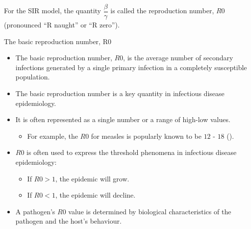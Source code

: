 \documentclass[
  ignorenonframetext,
]{beamer}
\providecommand{\tightlist}{%
  \setlength{\itemsep}{0pt}\setlength{\parskip}{0pt}}\usepackage{longtable,booktabs,array}
\begin{document}
\begin{frame}
For the SIR model, the quantity {\(\dfrac{\beta}{\gamma}\)} is called
the {reproduction number, \(R0\)} (pronounced ``R naught'' or ``R
zero'').
\end{frame}

\begin{frame}
\begin{block}{The basic reproduction number, R0}
\label{the-basic-reproduction-number-r0}
\begin{itemize}
\item
  The basic reproduction number, {\(R0\)}, is the average number of
  secondary infections generated by a {single primary infection} in a
  {completely susceptible} population.
\item
  The basic reproduction number is a key quantity in infectious disease
  epidemiology.
\end{itemize}
\end{block}
\end{frame}

\begin{frame}
\begin{itemize}
\tightlist
\item
  It is often represented as a single number or a range of high-low
  values.

  \begin{itemize}
  \tightlist
  \item
    For example, the \(R0\) for measles is popularly known to be \(12\)
    - \(18\) ().
  \end{itemize}
\end{itemize}
\end{frame}

\begin{frame}
\begin{itemize}
\tightlist
\item
  \(R0\) is often used to express the threshold phenomena in infectious
  disease epidemiology:

  \begin{itemize}
  \tightlist
  \item
    If \(R0 > 1\), the epidemic will grow.
  \item
    If \(R0 < 1\), the epidemic will decline.
  \end{itemize}
\item
  A pathogen's \(R0\) value is determined by biological characteristics
  of the pathogen and the host's behaviour.
\end{itemize}
\end{frame}
\end{document}
